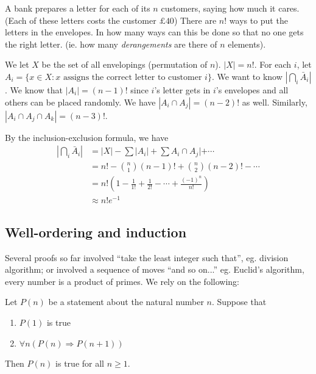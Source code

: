 \documentclass[a4paper]{article}
\begin{document}
  \begin{eg}
    A bank prepares a letter for each of its $n$ customers, saying how much it cares. (Each of these letters costs the customer $\pounds 40$) There are $n!$ ways to put the letters in the envelopes. In how many ways can this be done so that no one gets the right letter. (ie. how many \emph{derangements} are there of $n$ elements).

    We let $X$ be the set of all envelopings (permutation of $n$). $|X| = n!$. For each $i$, let $A_i = \{x\in X: x \text{ assigns the correct letter to customer }i\}$. We want to know $|\bigcap_i \bar A_i|$. We know that $|A_i| = (n - 1)!$ since $i$'s letter gets in $i$'s envelopes and all others can be placed randomly. We have $|A_i\cap A_j| = (n - 2)!$ as well. Similarly, $|A_i\cap A_j \cap A_k| = (n - 3)!$.

    By the inclusion-exclusion formula, we have
    \begin{align*}
      |\bigcap_i \bar A_i| &= |X| - \sum |A_i| + \sum A_i\cap A_j| + \cdots\\
      &= n! - \binom{n}{1}(n - 1)! + \binom{n}{2}(n - 2)! - \cdots\\
      &= n!\left(1 - \frac{1}{1!} + \frac{1}{2!} - \cdots + \frac{(-1)^n}{n!}\right)\\
      &\approx n! e^{-1}
    \end{align*}
  \end{eg}
  \subsection{Well-ordering and induction}
  Several proofs so far involved ``take the least integer such that'', eg. division algorithm; or involved a sequence of moves ``and so on...'' eg. Euclid's algorithm, every number is a product of primes. We rely on the following:
  \begin{thm}
    Let $P(n)$ be a statement about the natural number $n$. Suppose that 
    \begin{enumerate}
      \item $P(1)$ is true
      \item $\forall n(P(n)\Rightarrow P(n + 1))$
    \end{enumerate}
    Then $P(n)$ is true for all $n\geq 1$.
  \end{thm}
\end{document}
